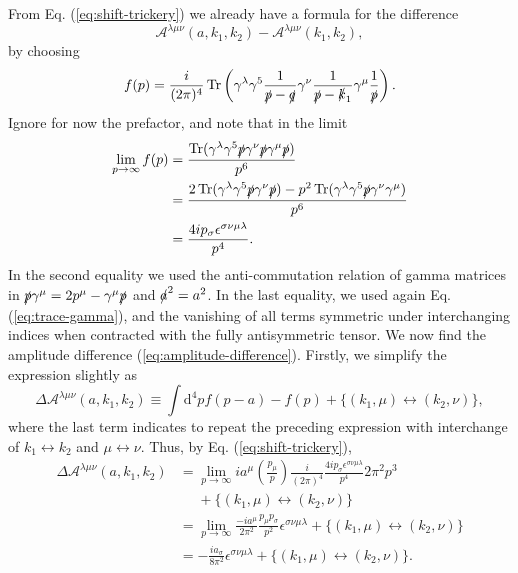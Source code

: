 From Eq. (\ref{eq:shift-trickery}) we already have a formula for the difference
\begin{equation}
  \label{eq:amplitude-difference}
  \mathcal{A}^{\lambda \mu \nu } (a, k_1, k_2) - \mathcal{A}^{\lambda \mu \nu }(k_1, k_2),
\end{equation}
by choosing
\[
  f(p) = \frac{i}{(2\pi)^{4}} \operatorname{Tr} \left( \gamma ^{\lambda }\gamma ^5 \frac{1}{\slashed{p} - \slashed{q}} \gamma ^{\nu } \frac{1}{\slashed{p} - \slashed{k}_{1}} \gamma ^{\mu } \frac{1}{\slashed{p} } \right). 
\]
Ignore for now the prefactor, and note that in the limit
\begin{equation}
  \begin{split}
    \lim_{p\to \infty } f(p) &=
    \frac{\operatorname{Tr}(\gamma ^{\lambda }\gamma ^5 \slashed{p} \gamma ^{\nu } \slashed{p}\gamma ^{\mu }\slashed{p})}{p^6}\\
    &= \frac{2 \operatorname{Tr}(\gamma ^{\lambda }\gamma ^5 \slashed{p}\gamma ^\nu \slashed{p}) - p^2\operatorname{Tr}(\gamma ^{\lambda }\gamma ^5 \slashed{p} \gamma ^{\nu }\gamma ^{\mu })}{p^6}\\
    &= \frac{{4i p_{\sigma }\epsilon ^{\sigma \nu \mu \lambda }}}{p^{4}}.
  \end{split}
\end{equation}
In the second equality we used the anti-commutation relation of gamma matrices in $\slashed{p} \gamma ^{\mu } = 2p^{\mu } - \gamma ^{\mu } \slashed{p}$ and $\slashed{a}^2 = a^2$.
In the last equality, we used again Eq. (\ref{eq:trace-gamma}), and the vanishing of all terms symmetric under interchanging indices when contracted with the fully antisymmetric tensor.
We now find the amplitude difference (\ref{eq:amplitude-difference}).
Firstly, we simplify the  expression slightly as
\begin{equation}
  \Delta \mathcal{A}^{\lambda \mu \nu }(a, k_1, k_2) \equiv \int \mathrm{d}^4p f(p-a) - f(p) +  \{(k_1,\mu ) \leftrightarrow (k_2, \nu )\},
\end{equation}
where the last term indicates to repeat the preceding expression with interchange of $k_1 \leftrightarrow  k_2$ and $\mu \leftrightarrow \nu$.
Thus, by Eq. (\ref{eq:shift-trickery}),
\begin{equation}
  \label{eq:amplitude-difference-explicit}
  \begin{split}
  \Delta \mathcal{A}^{\lambda \mu \nu}(a, k_1, k_2) &=
    \lim_{p\to \infty } i  a^{\mu } \left( \frac{p_{\mu }}{p} \right)
  \frac{i}{(2\pi)^{4}} \frac{{4ip_{\sigma }\epsilon ^{\sigma \nu \mu \lambda }}}{p^{4}}
  2\pi^2p^3\\
  &\phantom{=}+ \{(k_1,\mu ) \leftrightarrow (k_2, \nu )\}\\
  &= \lim_{p\to \infty } \frac{{-ia^{\mu }}}{2\pi^2} \frac{{p_{\mu }p_{\sigma }}}{p^2} \epsilon ^{\sigma \nu \mu \lambda } +  \{(k_1,\mu ) \leftrightarrow (k_2, \nu )\}\\
  &= - \frac{ia_{\sigma }}{8 \pi^2}\epsilon ^{\sigma \nu \mu \lambda } +  \{(k_1,\mu ) \leftrightarrow (k_2, \nu )\}.
  \end{split}
\end{equation}

